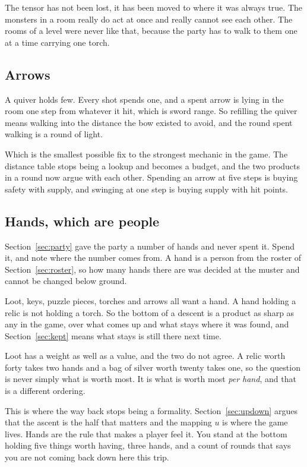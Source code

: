 \documentclass[11pt,a4paper]{article}
\begin{document}
\begin{sectionbox}
The tensor has not been lost, it has been moved to where it was always true. The monsters in a
room really do act at once and really cannot see each other. The rooms of a level were never
like that, because the party has to walk to them one at a time carrying one torch.
\end{sectionbox}

\subsection{Arrows}

A quiver holds few. Every shot spends one, and a spent arrow is lying in the room one step from
whatever it hit, which is sword range. So refilling the quiver means walking into the distance
the bow existed to avoid, and the round spent walking is a round of light.

Which is the smallest possible fix to the strongest mechanic in the game. The distance table
stops being a lookup and becomes a budget, and the two products in a round now argue with each
other. Spending an arrow at five steps is buying safety with supply, and swinging at one step is
buying supply with hit points.

\subsection{Hands, which are people}

Section~\ref{sec:party} gave the party a number of hands and never spent it. Spend it, and note
where the number comes from. A hand is a person from the roster of Section~\ref{sec:roster}, so
how many hands there are was decided at the muster and cannot be changed below ground.

Loot, keys, puzzle pieces, torches and arrows all want a hand. A hand holding a relic is not
holding a torch. So the bottom of a descent is a product as sharp as any in the game, over what
comes up and what stays where it was found, and Section~\ref{sec:kept} means what stays is still
there next time.

Loot has a weight as well as a value, and the two do not agree. A relic worth forty takes two
hands and a bag of silver worth twenty takes one, so the question is never simply what is worth
most. It is what is worth most \emph{per hand}, and that is a different ordering.

\begin{sectionbox}
This is where the way back stops being a formality. Section~\ref{sec:updown} argues that the
ascent is the half that matters and the mapping $u$ is where the game lives. Hands are the rule
that makes a player feel it. You stand at the bottom holding five things worth having, three
hands, and a count of rounds that says you are not coming back down here this trip.
\end{sectionbox}
\end{document}

